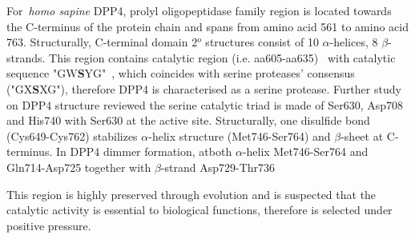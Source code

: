 For~\textit{homo sapine} DPP4, prolyl oligopeptidase family region is located towards the C-terminus of the protein chain and spans from amino acid 561 to amino acid 763. Structurally, C-terminal domain 2$^{o}$ structures consist of 10 $\alpha$-helices, 8 $\beta$-strands. This region contains catalytic region (i.e. aa605-aa635)~\cite{Rawlings1991,Barrett1992,Polgár1992,Rawlings1994} with catalytic sequence "GW\textbf{S}YG"~\cite{Ogata_1992}, which coincides with serine proteases' consensus ("GX\textbf{S}XG"), therefore DPP4 is characterised as a serine protease. Further study on DPP4 structure reviewed the serine catalytic triad is made of Ser630, Asp708 and His740 with Ser630 at the active site. Structurally, one disulfide bond (Cys649-Cys762) stabilizes $\alpha$-helix structure (Met746-Ser764) and $\beta$-sheet at C-terminus. In DPP4 dimmer formation, atboth $\alpha$-helix Met746-Ser764 and Gln714-Asp725 together with $\beta$-strand Asp729-Thr736 
\par
This region is highly preserved through evolution and is suspected that the catalytic activity is essential to biological functions, therefore is selected under positive pressure. 
